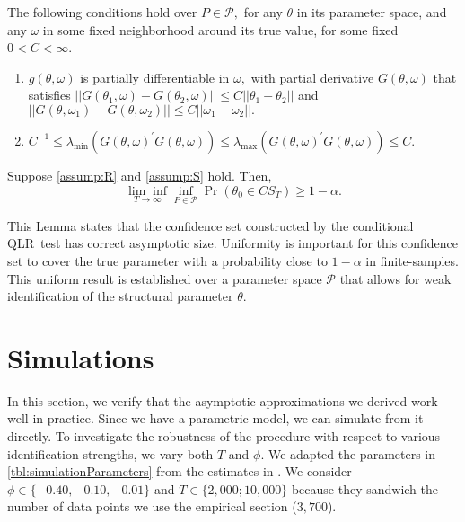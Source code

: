 \documentclass[11pt, letterpaper, twoside]{article}
\begin{document}
\begin{assumpS}
    \label{assump:S}
The following conditions hold over $P\in \mathcal{P},$ for any $\theta $ in its parameter space, and any $\omega $ in some fixed neighborhood around its true value, for some fixed $0<C<\infty$.
%
\begin{enumerate}
    \item $g(\theta ,\omega )$ is partially differentiable in $\omega ,$ with partial derivative $G(\theta ,\omega )$ that satisfies $||G(\theta _{1},\omega )-G(\theta _{2},\omega )||\leq C||\theta _{1}-\theta _{2}||$ and $||G(\theta ,\omega _{1})-G(\theta ,\omega _{2})||\leq C||\omega _{1}-\omega _{2}||.$
%
    \item $C^{-1}\leq \lambda_{\min }(G(\theta ,\omega )^{\prime }G(\theta ,\omega ))\leq \lambda_{\max }(G(\theta ,\omega )^{\prime }G(\theta ,\omega ))\leq C$.
\end{enumerate}
\end{assumpS}

\begin{theorem}
    \label{Lemma CS}
    Suppose \cref{assump:R} and \cref{assump:S} hold. Then, 
%
    \begin{equation*} 
        \underset{T\rightarrow \infty }{\lim \inf }\underset{P\in \mathcal{P}}{\inf }\Pr \left( \theta _{0}\in CS_{T}\right) \geq 1-\alpha .
    \end{equation*}
\end{theorem}

This Lemma states that the confidence set constructed by the conditional QLR\ test has correct asymptotic size. Uniformity is important for this confidence set to cover the true parameter with a probability close to $1-\alpha $ in finite-samples. This uniform result is established over a parameter space $\mathcal{P}$ that allows for weak identification of the structural parameter $\theta$.


\section{Simulations}\label{sec:simulation}

In this section, we verify that the asymptotic approximations we derived work well in practice.  Since we have a parametric model, we can simulate from it directly.  To investigate the robustness of the procedure with respect to various identification strengths, we vary both $T$ and $\phi$.  We adapted the parameters in \cref{tbl:simulationParameters} from the estimates in \textcite{han2018leverage}.  We consider $\phi \in \lbrace -0.40, -0.10, -0.01 \rbrace$ and $T \in \lbrace 2,000; 10,000 \rbrace$ because they sandwich the number of data points we use the empirical section ($3,700$).
\end{document}
